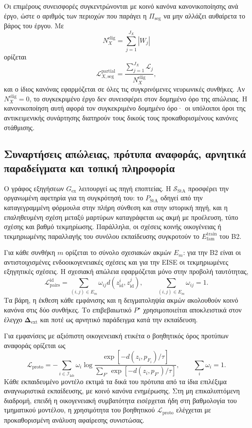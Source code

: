 \documentclass[11pt,a4paper]{article}
\begin{document}
Οι επιμέρους συνεισφορές συγκεντρώνονται με κοινό κανόνα κανονικοποίησης ανά έργο, ώστε ο αριθμός των περιοχών που παράγει η $\Pi_{\mathrm{seg}}$ να μην αλλάζει αυθαίρετα το βάρος του έργου. Με
\[
N_X^{\mathrm{elig}}=\sum_{j=1}^{J_X}|W_j|
\]
ορίζεται
\[
\mathcal L_{X,\mathrm{seg}}^{\mathrm{partial}}
=
\frac{\displaystyle\sum_{j=1}^{J_X}\mathcal L_j}
{N_X^{\mathrm{elig}}},
\]
και ο ίδιος κανόνας εφαρμόζεται σε όλες τις συγκρινόμενες νευρωνικές συνθήκες. Αν $N_X^{\mathrm{elig}}=0$, το συγκεκριμένο έργο δεν συνεισφέρει στον δομημένο όρο της απώλειας. Η κανονικοποίηση αυτή αφορά τον συγκεκριμένο δομημένο όρο· οι υπόλοιποι όροι της αντικειμενικής συνάρτησης διατηρούν τους δικούς τους προκαθορισμένους κανόνες στάθμισης.

\subsection{Συναρτήσεις απώλειας, πρότυπα αναφοράς, αρνητικά παραδείγματα και τοπική πληροφορία}\label{app:eise-loss}

Ο γράφος εξηγήσεων $G_{\mathrm{ex}}$ λειτουργεί ως πηγή εποπτείας. Η $\mathcal S_{\mathrm{StA}}$ προσφέρει την οργανωμένη αφετηρία για τη συγκρότησή του: το $P_{\mathrm{StA}}$ οδηγεί από την καταγεγραμμένη φόρμουλα στην πλήρη σύνθεση και στην ιστορική πηγή, και η επαληθευμένη σχέση μεταξύ μαρτύρων καταγράφεται ως ακμή με προέλευση, τύπο σχέσης και βαθμό τεκμηρίωσης. Παράλληλα, οι σχέσεις κοινής οικογένειας ή τεκμηριωμένης παραλλαγής του συνόλου εκπαίδευσης συγκροτούν το $E_{\mathrm{fam}}^{\mathrm{train}}$ του B2.

Για κάθε συνθήκη $m$ ορίζεται το σύνολο σχεσιακών ακμών $E_m$: για την B2 είναι οι αντιστοιχισμένες ενδοοικογενειακές σχέσεις και για την EISE οι τεκμηριωμένες εξηγητικές σχέσεις. Η σχεσιακή απώλεια εφαρμόζεται μόνο στην προβολή ταυτότητας,
\[
\mathcal L_{\mathrm{pairs}}^{\mathrm{id}}
=\sum_{(i,j)\in E_m}\omega_{ij}
 d\!\left(z_{\mathrm{id}}^{i},z_{\mathrm{id}}^{j}\right),
\qquad
\sum_{(i,j)\in E_m}\omega_{ij}=1.
\]
Τα βάρη, η έκθεση κάθε εμφάνισης και η δειγματοληψία ακμών ακολουθούν κοινό κανόνα στις δύο συνθήκες. Το επιβεβαιωτικό $P^{\star}$ χρησιμοποιείται αποκλειστικά στον έλεγχο $\boldsymbol{\Delta}_{\mathrm{ext}}$ και ποτέ ως αρνητικό παράδειγμα κατά την εκπαίδευση.

Για εμφανίσεις με αξιόπιστη οικογενειακή ετικέτα ο βοηθητικός όρος προτύπων αναφοράς ορίζεται ως
\[
\mathcal L_{\mathrm{proto}}
=-\sum_{i\in\mathcal I_{\mathrm{lab}}}\omega_i
\log
\frac{\exp[-d(z_i,p_{F_i})/\tau]}
{\sum_{F'}\exp[-d(z_i,p_{F'})/\tau]},
\qquad \sum_i\omega_i=1.
\]
Κάθε εκπαιδευμένο μοντέλο εκτιμά τα δικά του πρότυπα από τα ίδια επιλέξιμα αναγνωριστικά εκπαίδευσης, με κοινό κανόνα ενημέρωσης. Στη μη επικαλυπτόμενη διαδρομή, επειδή η οικογενειακή συμβατότητα εισέρχεται ήδη στη βαθμολογία του τμηματικού μοντέλου, η χρησιμότητα του βοηθητικού $\mathcal L_{\mathrm{proto}}$ ελέγχεται με προκαθορισμένη ανάλυση αφαίρεσης συνιστώσας.
\end{document}
